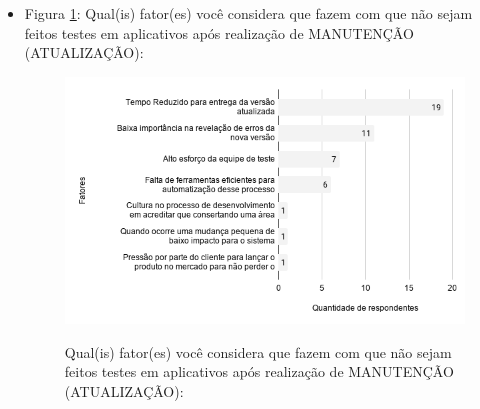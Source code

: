 \begin{itemize}
    
    \item Figura \ref{figure:s_fatorestestemanutencao}: Qual(is) fator(es) você considera que fazem com que não sejam feitos testes em aplicativos após realização de MANUTENÇÃO (ATUALIZAÇÃO):
        \begin{figure}[!htb]
        \centering
        \includegraphics[width=.80\textwidth]{images/s_fatorestestemanutencao.png}
        \label{figure:s_fatorestestemanutencao}
        \caption{Qual(is) fator(es) você considera que fazem com que não sejam feitos testes em aplicativos após realização de MANUTENÇÃO (ATUALIZAÇÃO):}
        \end{figure}
    

    

\end{itemize}
